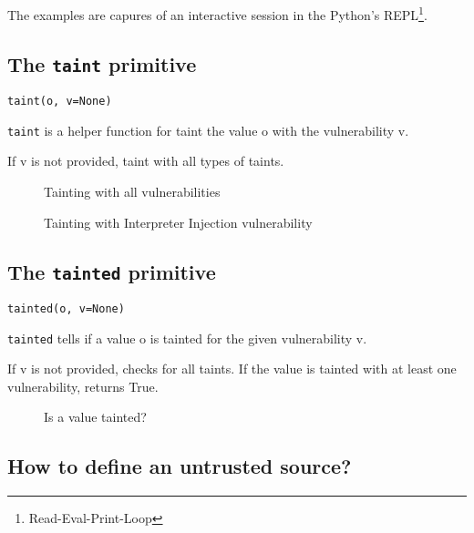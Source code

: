 The examples are capures of an interactive session in 
the Python's REPL\footnote{Read-Eval-Print-Loop}. %

\subsection*{The \texttt{taint} primitive}

\texttt{taint(o, v=None)}

\texttt{taint} is a helper function for taint
the value o with the vulnerability v.

If v is not provided, taint with all types of taints.

\begin{figure}[t]
{\small{
\begin{minipage}[t]{0.5\linewidth}
 
\end{minipage}
\caption{\label{fig:taint1}Tainting with all vulnerabilities}
}}
\end{figure}

\begin{figure}[t]
{\small{
\begin{minipage}[t]{0.5\linewidth}
 
\end{minipage}
\caption{\label{fig:taint2}Tainting with Interpreter Injection vulnerability}
}}
\end{figure}

\subsection*{The \texttt{tainted} primitive}

\texttt{tainted(o, v=None)}

\texttt{tainted} tells if a value o is tainted for the given
vulnerability v.

If v is not provided, checks for all taints. If the value is tainted
with at least one vulnerability, returns True.

\begin{figure}[t]
{\small{
\begin{minipage}[t]{0.5\linewidth}
 
\end{minipage}
\caption{\label{fig:taint1}Is a value tainted?}
}}
\end{figure}

\subsection*{How to define an untrusted source?}

